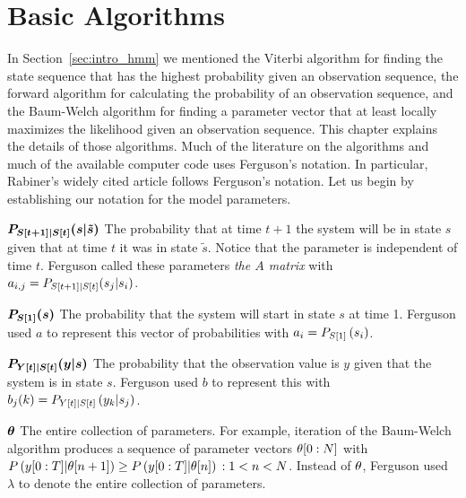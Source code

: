 \chapter{Basic Algorithms}
\label{chap:algorithms}

In Section~\ref{sec:intro_hmm} we mentioned the Viterbi algorithm for
finding the state sequence that has the highest probability given an
observation sequence, the forward algorithm for calculating the
probability of an observation sequence, and the Baum-Welch algorithm
for finding a parameter vector that at least locally maximizes the
likelihood given an observation sequence.  This chapter explains the
details of those algorithms.  Much of the literature on the algorithms
and much of the available computer code uses Ferguson's
\cite{Ferguson80} notation.  In particular, Rabiner's \cite{Rabiner89}
widely cited article follows Ferguson's notation.  Let us begin by
establishing our notation for the model parameters.
\setlength{\nomlabelwidth}{2.7cm}%
\begin{symbdescription}
\item[$\bm{P_{{S}{[t+1]}|{S}{[t]}}(s|{\tilde s})}$] The probability
  that at time $t+1$ the system will be in state $s$ given that at
  time $t$ it was in state ${\tilde s}$.  Notice that the parameter is
  independent of time $t$.  Ferguson called these parameters \emph{the
    $A$ matrix} with
  $a_{i,j} = P_{{S}{[t+1]}|{S}{[t]}}(s_j|s_i)$.
\item[$\bm{P_{{S}{[1]}}(s)}$] The probability that the system will
  start in state $s$ at time 1.  Ferguson used $a$ to represent this
  vector of probabilities with $a_i = P_{{S}{[1]}} \left(s_i \right)$.
\item[$\bm{P_{{Y}{[t]}|{S}{[t]}}(y|s)}$] The probability
  that the observation value is $y$ given that the system is in
  state $s$.  Ferguson used $b$ to represent this with
  $b_j(k) = P_{{Y}{[t]}|{S}{[t]}} \left(y_k|s_j \right)$.
\item[$\bm{\theta}$] The entire collection of parameters.  For
  example, iteration of the Baum-Welch algorithm produces a sequence
  of parameter vectors $\theta[0:N]$ with
  $P\left(y[0:T]|{\theta}{[n+1]}\right) \geq
  P\left(y[0:T]|{\theta}{[n]}\right)\, : 1 < n < N$.
  Instead of $\theta$, Ferguson used $\lambda$ to denote the
  entire collection of parameters.
\end{symbdescription}

